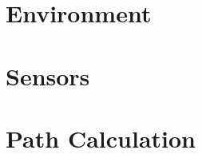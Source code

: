 \documentclass[11pt]{report}
\begin{document}



\tableofcontents

\chapter{Environment} \label{chap:environment}


\chapter{Sensors}\label{chap:sensors}


\chapter{Path Calculation}\label{chap:pathCalculation}


\listoffigures
\listoftables
{}

\end{document}
